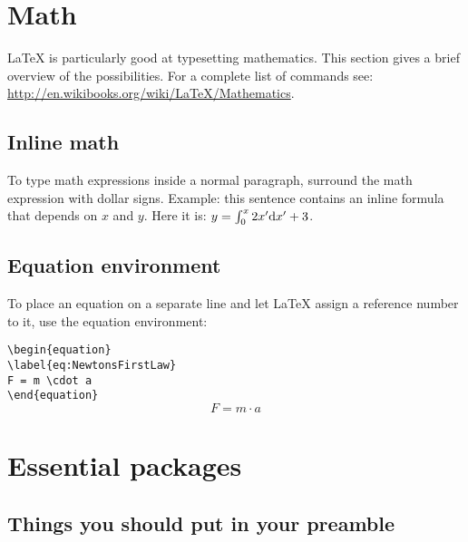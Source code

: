 \documentclass{article}
\begin{document}
\section{Math}

\LaTeX{} is particularly good at typesetting mathematics. This section gives a brief overview of the possibilities. For a complete list of commands see: \url{http://en.wikibooks.org/wiki/LaTeX/Mathematics}.

\subsection{Inline math}

To type math expressions inside a normal paragraph, surround the math expression with dollar signs. Example: this sentence contains an inline formula that depends on $x$ and $y$. Here it is: $y=\int_{0}^{x} 2x'\textnormal{d}x'+3 $.


\subsection{Equation environment}

To place an equation on a separate line and let \LaTeX{} assign a reference number to it, use the equation environment:
\vspace{1em}

\noindent\verb|\begin{equation}|\\
\verb|\label{eq:NewtonsFirstLaw}|\\
\verb|F = m \cdot a|\\
\verb|\end{equation}|\\

\begin{equation}
\label{eq:NewtonsFirstLaw}
F = m \cdot a
\end{equation}

\newpage
\section{Essential packages}

\subsection{Things you should put in your preamble}
\end{document}
